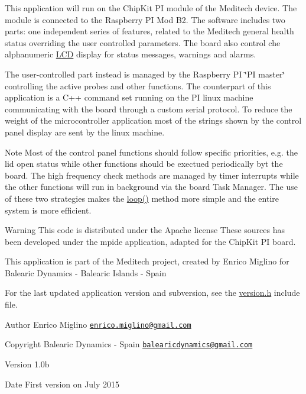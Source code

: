 This application will run on the Chip\-Kit P\-I module of the Meditech device. The module is connected to the Raspberry P\-I Mod B2. The software includes two parts\-: one independent series of features, related to the Meditech general health status overriding the user controlled parameters. The board also control che alphanumeric \hyperlink{class_l_c_d}{L\-C\-D} display for status messages, warnings and alarms. \par
The user-\/controlled part instead is managed by the Raspberry P\-I \char`\"{}\-P\-I master\char`\"{} controlling the active probes and other functions. The counterpart of this application is a C++ command set running on the P\-I linux machine communicating with the board through a custom serial protocol. To reduce the weight of the microcontroller application most of the strings shown by the control panel display are sent by the linux machine.

\begin{DoxyNote}{Note}
Most of the control panel functions should follow specific priorities, e.\-g. the lid open status while other functions should be exectued periodically byt the board. The high frequency check methods are managed by timer interrupts while the other functions will run in background via the board Task Manager. The use of these two strategies makes the \hyperlink{_meditech___chip_kit_control_panel_8pde_a0b33edabd7f1c4e4a0bf32c67269be2f}{loop()} method more simple and the entire system is more efficient.
\end{DoxyNote}
\begin{DoxyWarning}{Warning}
This code is distributed under the Apache license These sources has been developed under the mpide application, adapted for the Chip\-Kit P\-I board.\par
This application is part of the Meditech project, created by Enrico Miglino for Balearic Dynamics -\/ Balearic Islands -\/ Spain\par
For the last updated application version and subversion, see the \hyperlink{_version_8h}{version.\-h} include file.
\end{DoxyWarning}
\begin{DoxyAuthor}{Author}
Enrico Miglino \href{mailto:enrico.miglino@gmail.com}{\tt enrico.\-miglino@gmail.\-com} 
\end{DoxyAuthor}
\begin{DoxyCopyright}{Copyright}
Balearic Dynamics -\/ Spain \href{mailto:balearicdynamics@gmail.com}{\tt balearicdynamics@gmail.\-com} 
\end{DoxyCopyright}
\begin{DoxyVersion}{Version}
1.\-0b 
\end{DoxyVersion}
\begin{DoxyDate}{Date}
First version on July 2015 
\end{DoxyDate}
